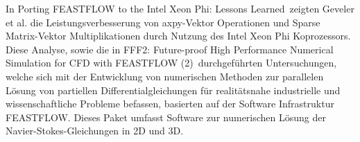 In \glqq Porting FEASTFLOW to the Intel Xeon Phi: Lessons Learned\grqq\, zeigten Geveler et al. die Leistungsverbesserung von axpy-Vektor Operationen und Sparse Matrix-Vektor Multiplikationen durch Nutzung des Intel Xeon Phi Koprozessors. Diese Analyse, sowie die in \glqq FFF2: Future-proof High Performance Numerical Simulation for CFD with FEASTFLOW (2)\grqq\, durchgeführten Untersuchungen, welche sich mit der Entwicklung von numerischen Methoden zur parallelen Lösung von partiellen Differentialgleichungen für realitätsnahe industrielle und wissenschaftliche Probleme befassen, basierten auf der Software Infrastruktur \glqq FEASTFLOW\grqq. Dieses Paket umfasst Software zur numerischen Lösung der Navier-Stokes-Gleichungen in 2D und 3D. 
